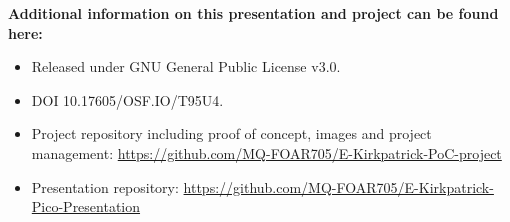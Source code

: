 \documentclass[unknownkeysallowed,usepdftitle=false, aspectratio=169, parskip=full]{beamer}
\newcommand{\secvariable}{nothing}
\newcommand{\mysection}[1]{\renewcommand{\secvariable}{#1}
}
\begin{document}
\mysection{conclusion}
\begin{frame}\label{\secvariable}

\textbf{Additional information on this presentation and project can be found here:} 
\begin{itemize}
    \item Released under GNU General Public License v3.0.
    \item DOI 10.17605/OSF.IO/T95U4.
    \item Project repository including proof of concept, images and project management: \url{https://github.com/MQ-FOAR705/E-Kirkpatrick-PoC-project} 
    \item Presentation repository: \url{https://github.com/MQ-FOAR705/E-Kirkpatrick-Pico-Presentation}
\end{itemize}



 

\end{frame}
\end{document}
